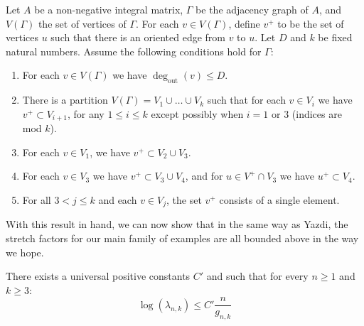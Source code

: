 \begin{lem}[Yazdi]
\label{lem:spectral}
Let $A$ be a non-negative integral matrix, $\Gamma$ be the adjacency graph of $A$, and $V(\Gamma)$ the set of vertices of $\Gamma$. For each $v \in V(\Gamma)$, define $v^+$ to be the set of vertices $u$ such that there is an oriented edge from $v$ to $u$. Let $D$ and $k$ be fixed natural numbers. Assume the following conditions hold for $\Gamma$: \begin{enumerate}
    \item For each $v \in V(\Gamma)$ we have $\deg_{\text{out}}(v) \leq D$.
    \item There is a partition $V(\Gamma) = V_1 \cup \dots \cup V_k$ such that for each $v \in V_i$ we have $v^+ \subset V_{i+1}$, for any $1 \leq i \leq k$ except possibly when $i = 1$ or 3 (indices are mod $k$).
    \item For each $v \in V_1$, we have $v^+ \subset V_2 \cup V_3$.
    \item For each $v \in V_3$ we have $v^+ \subset V_3 \cup V_4$, and for $u \in V^+ \cap V_3$ we have $u^+ \subset V_4$.
    \item For all $3 < j \leq k$ and each $v \in V_j$, the set $v^+$ consists of a single element.
\end{enumerate}
\end{lem}

With this result in hand, we can now show that in the same way as Yazdi, the stretch factors for our main family of examples are all bounded above in the way we hope. 

\begin{lem}
There exists a universal positive constants $C'$ and such that for every $n \geq 1$ and $k \geq 3$:
$$\log(\lambda_{n,k}) \leq C'\frac{n}{g_{n,k}}$$
\end{lem}

